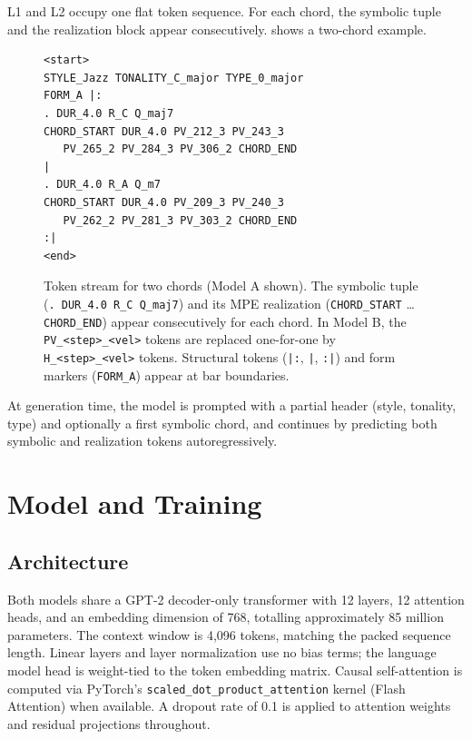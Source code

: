 \documentclass{aimc2026}
\begin{document}
L1 and L2 occupy one flat token sequence. For each chord, the symbolic tuple and the realization block appear consecutively.  shows a two-chord example.

\begin{figure}[hbt!]
  \centering
  \small
  \begin{verbatim}
<start>
STYLE_Jazz TONALITY_C_major TYPE_0_major
FORM_A |:
. DUR_4.0 R_C Q_maj7
CHORD_START DUR_4.0 PV_212_3 PV_243_3
   PV_265_2 PV_284_3 PV_306_2 CHORD_END
|
. DUR_4.0 R_A Q_m7
CHORD_START DUR_4.0 PV_209_3 PV_240_3
   PV_262_2 PV_281_3 PV_303_2 CHORD_END
:|
<end>
  \end{verbatim}
  \caption{Token stream for two chords (Model A shown). The symbolic tuple (\texttt{. DUR\_4.0 R\_C Q\_maj7}) and its MPE realization (\texttt{CHORD\_START} \ldots{} \texttt{CHORD\_END}) appear consecutively for each chord. In Model B, the \texttt{PV\_<step>\_<vel>} tokens are replaced one-for-one by \texttt{H\_<step>\_<vel>} tokens. Structural tokens (\texttt{|:}, \texttt{|}, \texttt{:|}) and form markers (\texttt{FORM\_A}) appear at bar boundaries.}
  \label{fig:token_stream}
\end{figure}

At generation time, the model is prompted with a partial header (style, tonality, type) and optionally a first symbolic chord, and continues by predicting both symbolic and realization tokens autoregressively.

\section{Model and Training}
\label{sec:model}

\subsection{Architecture}

Both models share a GPT-2 decoder-only transformer \citep{radford2019language} with 12 layers, 12 attention heads, and an embedding dimension of 768, totalling approximately 85 million parameters. The context window is 4,096 tokens, matching the packed sequence length. Linear layers and layer normalization use no bias terms; the language model head is weight-tied to the token embedding matrix. Causal self-attention is computed via PyTorch's \texttt{scaled\_dot\_product\_attention} kernel (Flash Attention) when available. A dropout rate of 0.1 is applied to attention weights and residual projections throughout.
\end{document}
